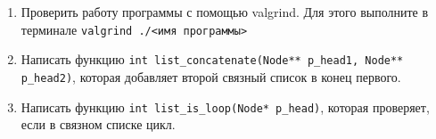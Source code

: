 \documentclass{article}
\begin{document}
\begin{enumerate}
\item Проверить работу программы с помощью valgrind. Для этого выполните в терминале \texttt{valgrind ./<имя программы>}

\item Написать функцию \texttt{int list\_concatenate(Node** p\_head1, Node** p\_head2)}, которая добавляет второй связный список в конец первого.

\item Написать функцию \texttt{int list\_is\_loop(Node* p\_head)}, которая проверяет, если в связном списке цикл.


\end{enumerate}
\end{document}
